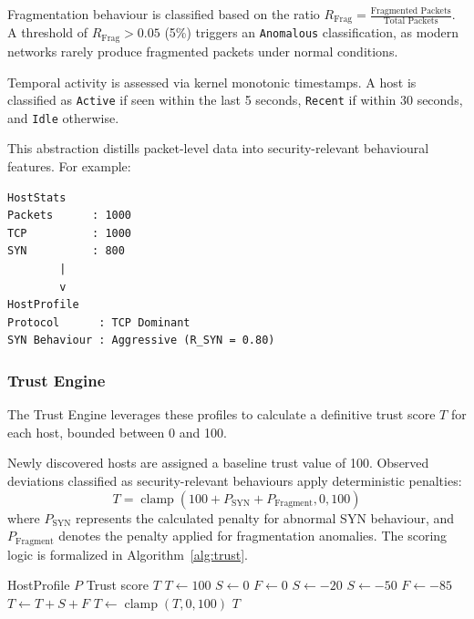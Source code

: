 \documentclass[conference]{IEEEtran}
\begin{document}
Fragmentation behaviour is classified based on the ratio $R_{\text{Frag}} = \frac{\text{Fragmented Packets}}{\text{Total Packets}}$. A threshold of $R_{\text{Frag}} > 0.05$ (5\%) triggers an \texttt{Anomalous} classification, as modern networks rarely produce fragmented packets under normal conditions.

Temporal activity is assessed via kernel monotonic timestamps. A host is classified as \texttt{Active} if seen within the last 5 seconds, \texttt{Recent} if within 30 seconds, and \texttt{Idle} otherwise.

This abstraction distills packet-level data into security-relevant behavioural features. For example:

\begin{verbatim}
HostStats
Packets      : 1000
TCP          : 1000
SYN          : 800
        |
        v
HostProfile
Protocol      : TCP Dominant
SYN Behaviour : Aggressive (R_SYN = 0.80)
\end{verbatim}

\subsubsection{Trust Engine}
The Trust Engine leverages these profiles to calculate a definitive trust score $T$ for each host, bounded between 0 and 100. 

Newly discovered hosts are assigned a baseline trust value of 100. Observed deviations classified as security-relevant behaviours apply deterministic penalties:
\begin{equation}
T = \operatorname{clamp}\left(100 + P_{\text{SYN}} + P_{\text{Fragment}}, 0, 100\right)
\end{equation}
where $P_{\text{SYN}}$ represents the calculated penalty for abnormal SYN behaviour, and $P_{\text{Fragment}}$ denotes the penalty applied for fragmentation anomalies. The scoring logic is formalized in Algorithm~\ref{alg:trust}.

\begin{algorithm}[h]
\caption{ADG Host Trust Computation}
\label{alg:trust}
\begin{algorithmic}[1]
\REQUIRE HostProfile $P$
\ENSURE Trust score $T$
\STATE $T \leftarrow 100$
\STATE $S \leftarrow 0$
\STATE $F \leftarrow 0$
    \STATE $S \leftarrow -20$
    \STATE $S \leftarrow -50$
\ENDIF
{}
    \STATE $F \leftarrow -85$
\ENDIF
\STATE $T \leftarrow T + S + F$
\STATE $T \leftarrow \operatorname{clamp}(T, 0, 100)$
\RETURN $T$
\end{algorithmic}
\end{algorithm}
\end{document}
